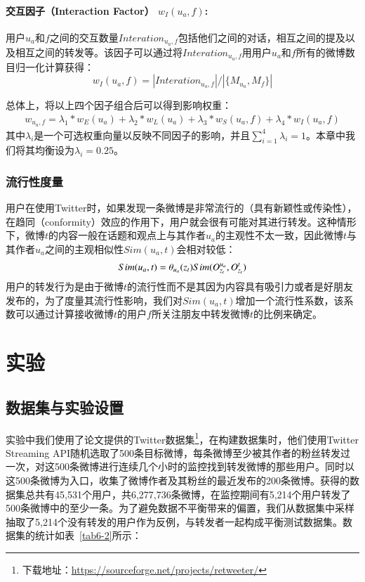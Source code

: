 \paragraph{交互因子（Interaction Factor） $ w_I(u_a,f) $:} 
用户$ u_a $和$ f $之间的交互数量$ Interation_{u_a,f} $包括他们之间的对话，相互之间的提及以及相互之间的转发等。该因子可以通过将$Interation_{u_a,f}$用用户$ u_a $和$ f $所有的微博数目归一化计算获得：
\begin{equation}
w_I(u_a,f)=|Interation_{u_a,f}| /|\{ M_{u_a}, M_f \}|
\end{equation}

总体上，将以上四个因子组合后可以得到影响权重：
\begin{equation}
\begin{split}
w_{u_a,f}= \lambda_1*w_E(u_a)+\lambda_2*w_L(u_a)+
  \lambda_3*w_S(u_a,f)+\lambda_4*w_I(u_a,f)
\end{split}
\end{equation}
其中$ \lambda_i $是一个可选权重向量以反映不同因子的影响，并且$ \sum_{i=1}^{4}\lambda_i=1 $。本章中我们将其均衡设为$ \lambda_i=0.25 $。

\subsubsection{流行性度量}
用户在使用Twitter时，如果发现一条微博是非常流行的（具有新颖性或传染性），在趋同（conformity）效应的作用下，用户就会很有可能对其进行转发。这种情形下，微博$ t $的内容一般在话题和观点上与其作者$ u_a $的主观性不太一致，因此微博$ t $与其作者$ u_a $之间的主观相似性$ Sim(u_a,t) $会相对较低：
\begin{equation}
Sim(u_a,t)=\theta_{u_a}(z_t)\* Sim(O_{z_t}^{u_a},O_{z_t}^{t})
\end{equation}
用户的转发行为是由于微博$ t $的流行性而不是其因为内容具有吸引力或者是好朋友发布的，为了度量其流行性影响，我们对$ Sim(u_a,t) $增加一个流行性系数，该系数可以通过计算接收微博$ t $的用户$ f $所关注朋友中转发微博$ t $的比例来确定。

\section{实验}
\label{experiments}

\subsection{数据集与实验设置}
实验中我们使用了论文提供的Twitter数据集\footnote{下载地址：\url{https://sourceforge.net/projects/retweeter/}}，在构建数据集时，他们使用Twitter Streaming API随机选取了500条目标微博，每条微博至少被其作者的粉丝转发过一次，对这500条微博进行连续几个小时的监控找到转发微博的那些用户。同时以这500条微博为入口，收集了微博作者及其粉丝的最近发布的200条微博。获得的数据集总共有45,531个用户，共6,277,736条微博，在监控期间有5,214个用户转发了500条微博中的至少一条。为了避免数据不平衡带来的偏置，我们从数据集中采样抽取了5,214个没有转发的用户作为反例，与转发者一起构成平衡测试数据集。数据集的统计如表~\ref{tab6-2}所示：

